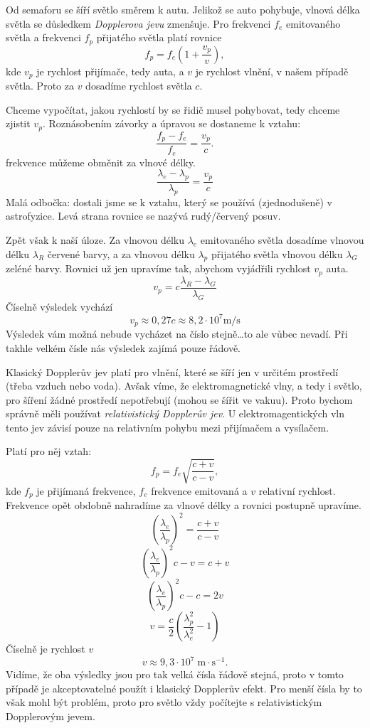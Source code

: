 \documentclass{../../../../style/mkimain}
\begin{document}
\noindent{}
\klein
Od semaforu se šíří světlo směrem k autu. Jelikož se auto pohybuje, vlnová délka světla se důsledkem \emph{Dopplerova jevu} zmenšuje.
Pro frekvenci $f_e$ emitovaného světla a frekvenci $f_p$ přijatého světla platí rovnice
$$f_p=f_e\left(1+\frac{v_p}{v}\right),$$
kde $v_p$ je rychlost přijímače, tedy auta, a $v$ je rychlost vlnění, v našem případě světla.
Proto za $v$ dosadíme rychlost světla $c$.

Chceme vypočítat, jakou rychlostí by se řidič musel pohybovat, tedy chceme zjistit $v_p$.
Roznásobením závorky a úpravou se dostaneme k vztahu:
$$\frac{f_p-f_e}{f_e}=\frac{v_p}{c}.$$
frekvence můžeme obměnit za vlnové délky.
$$\frac{\lambda_e-\lambda_p}{\lambda_p}=\frac{v_p}{c}$$
Malá odbočka: dostali jsme se k vztahu, který se používá (zjednodušeně) v astrofyzice. Levá strana rovnice se nazývá rudý/červený posuv.

Zpět však k naší úloze.
Za vlnovou délku $\lambda_e$ emitovaného světla dosadíme vlnovou délku $\lambda_R$ červené barvy, a za vlnovou délku $\lambda_p$ přijatého světla vlnovou délku $\lambda_G$ zeléné barvy. 
Rovnici už jen upravíme tak, abychom vyjádřili rychlost $v_p$ auta.
$${v_p}=c\frac{\lambda_R-\lambda_G}{\lambda_G}$$
Číselně výsledek vychází
$$v_p\approx0,27c\approx8,2\cdot10^7\si{\m\per\s}$$
Výsledek vám možná nebude vycházet na číslo stejně\dots to ale vůbec nevadí. Při takhle velkém čísle nás výsledek zajímá pouze řádově.

Klasický Dopplerův jev platí pro vlnění, které se šíří jen v určitém prostředí (třeba vzduch nebo voda).
Avšak víme, že elektromagnetické vlny, a tedy i světlo, pro šíření žádné prostředí nepotřebují (mohou se šířit ve vakuu).
Proto bychom správně měli používat \textit{relativistický Dopplerův jev}.
U elektromagentických vln tento jev závisí pouze na relativním pohybu mezi přijímačem a vysílačem.

\noindent
Platí pro něj vztah:
$$f_p=f_e\sqrt{\frac{c+v}{c-v}},$$
kde $f_p$ je přijímaná frekvence, $f_e$ frekvence emitovaná a $v$ relativní rychlost.
Frekvence opět obdobně nahradíme za vlnové délky a rovnici postupně upravíme.
$$\left(\frac{\lambda_e}{\lambda_p}\right)^2=\frac{c+v}{c-v}$$
$$\left(\frac{\lambda_e}{\lambda_p}\right)^2{c-v}={c+v}$$
$$\left(\frac{\lambda_e}{\lambda_p}\right)^2c-c=2v$$
$$v=\frac{c}{2}\left(\frac{\lambda_p^2}{\lambda_e^2}-1\right)$$
Číselně je rychlost $v$
$$v\approx9,3\cdot10^7\;\mathrm{m\cdot s^{-1}}.$$
Vidíme, že oba výsledky jsou pro tak velká čísla řádově stejná, proto v tomto případě je akceptovatelné použít i klasický Dopplerův efekt.
Pro menší čísla by to však mohl být problém, proto pro světlo vždy počítejte s relativistickým Dopplerovým jevem.
\end{document}
